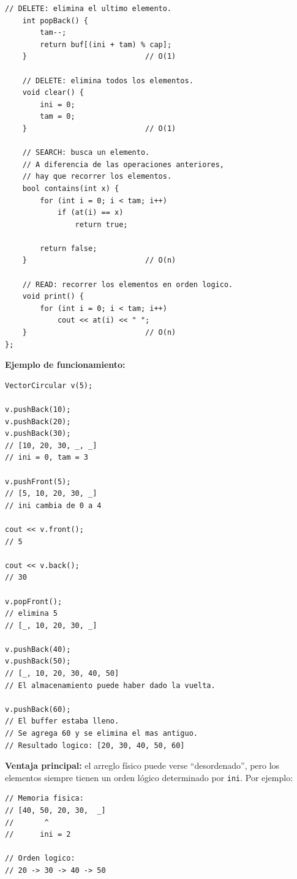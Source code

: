 \documentclass[10pt,a4paper,twocolumn]{article}
\begin{document}
\begin{lstlisting}[style=cpp]
    // DELETE: elimina el ultimo elemento.
    int popBack() {
        tam--;
        return buf[(ini + tam) % cap];
    }                           // O(1)

    // DELETE: elimina todos los elementos.
    void clear() {
        ini = 0;
        tam = 0;
    }                           // O(1)

    // SEARCH: busca un elemento.
    // A diferencia de las operaciones anteriores,
    // hay que recorrer los elementos.
    bool contains(int x) {
        for (int i = 0; i < tam; i++)
            if (at(i) == x)
                return true;

        return false;
    }                           // O(n)

    // READ: recorrer los elementos en orden logico.
    void print() {
        for (int i = 0; i < tam; i++)
            cout << at(i) << " ";
    }                           // O(n)
};
\end{lstlisting}

\textbf{Ejemplo de funcionamiento:}

\begin{lstlisting}[style=cpp]
VectorCircular v(5);

v.pushBack(10);
v.pushBack(20);
v.pushBack(30);
// [10, 20, 30, _, _]
// ini = 0, tam = 3

v.pushFront(5);
// [5, 10, 20, 30, _]
// ini cambia de 0 a 4

cout << v.front();
// 5

cout << v.back();
// 30

v.popFront();
// elimina 5
// [_, 10, 20, 30, _]

v.pushBack(40);
v.pushBack(50);
// [_, 10, 20, 30, 40, 50]
// El almacenamiento puede haber dado la vuelta.

v.pushBack(60);
// El buffer estaba lleno.
// Se agrega 60 y se elimina el mas antiguo.
// Resultado logico: [20, 30, 40, 50, 60]
\end{lstlisting}

\textbf{Ventaja principal:} el arreglo físico puede verse ``desordenado'',
pero los elementos siempre tienen un orden lógico determinado por
\texttt{ini}. Por ejemplo:

\begin{lstlisting}[style=cpp]
// Memoria fisica:
// [40, 50, 20, 30,  _]
//       ^
//      ini = 2

// Orden logico:
// 20 -> 30 -> 40 -> 50
\end{lstlisting}
\end{document}
